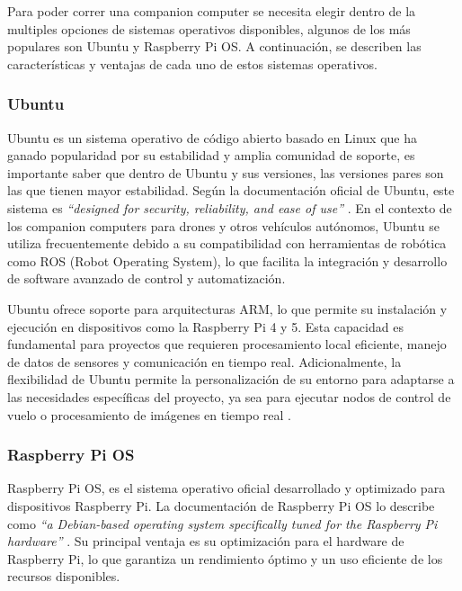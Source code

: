     Para poder correr una companion computer se necesita elegir dentro de la multiples opciones de sistemas operativos disponibles, algunos de los más populares son Ubuntu y Raspberry Pi OS. A continuación, se describen las características y ventajas de cada uno de estos sistemas operativos.

    \subsubsection{Ubuntu}

    Ubuntu es un sistema operativo de código abierto basado en Linux que ha ganado popularidad por su estabilidad y amplia comunidad de soporte, es importante saber que dentro de Ubuntu y sus versiones, las versiones pares son las que tienen mayor estabilidad. Según la documentación oficial de Ubuntu, este sistema es \textit{“designed for security, reliability, and ease of use”} \cite{ubuntu_docs}. En el contexto de los companion computers para drones y otros vehículos autónomos, Ubuntu se utiliza frecuentemente debido a su compatibilidad con herramientas de robótica como ROS (Robot Operating System), lo que facilita la integración y desarrollo de software avanzado de control y automatización.

    Ubuntu ofrece soporte para arquitecturas ARM, lo que permite su instalación y ejecución en dispositivos como la Raspberry Pi 4 y 5. Esta capacidad es fundamental para proyectos que requieren procesamiento local eficiente, manejo de datos de sensores y comunicación en tiempo real. Adicionalmente, la flexibilidad de Ubuntu permite la personalización de su entorno para adaptarse a las necesidades específicas del proyecto, ya sea para ejecutar nodos de control de vuelo o procesamiento de imágenes en tiempo real \cite{ubuntu_docs}.


    \subsubsection{Raspberry Pi OS}

    Raspberry Pi OS, es el sistema operativo oficial desarrollado y optimizado para dispositivos Raspberry Pi. La documentación de Raspberry Pi OS lo describe como \textit{“a Debian-based operating system specifically tuned for the Raspberry Pi hardware”} \cite{raspbian_docs}. Su principal ventaja es su optimización para el hardware de Raspberry Pi, lo que garantiza un rendimiento óptimo y un uso eficiente de los recursos disponibles.

